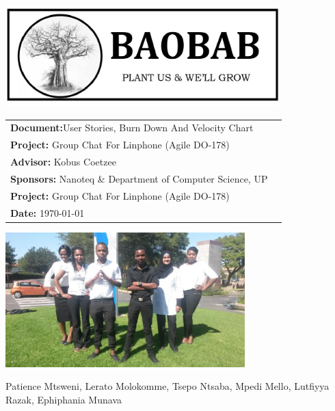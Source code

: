 \begin{titlepage}

\begin{center}

\includegraphics[width=400px]{pictures/logo.jpg}
\vspace{0.5 cm}
\begin{flushright} \large
\begin{tabular}{lr}
\vspace{1 cm}
\LARGE\textbf{Document:}User Stories, Burn Down And Velocity Chart\\

\vspace{1 cm}
\LARGE\textbf{Project:} Group Chat For Linphone (Agile DO-178)\\
\vspace{1 cm}
\LARGE\textbf{Advisor:} Kobus Coetzee\\
\vspace{1 cm}
\LARGE\textbf{Sponsors:} Nanoteq \& Department of Computer Science, UP\\
\vspace{1 cm}
\LARGE\textbf{Project:} Group Chat For Linphone (Agile DO-178)\\
\LARGE\textbf{Date: }\today\\
\end{tabular}
\end{flushright}

\centering \includegraphics[width=350px]{pictures/Team.jpg}

Patience Mtsweni, Lerato Molokomme, Tsepo Ntsaba, Mpedi Mello, Lutfiyya Razak, Ephiphania Munava\\


\end{center}
\end{titlepage}